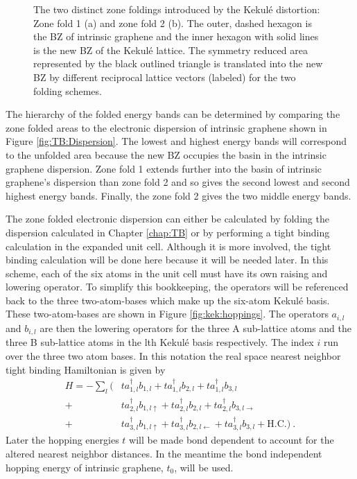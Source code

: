 \begin{figure}
	\begin{center}
	
	\end{center}
	\caption[The zone foldings introduced by the Kekul\'e distortion]{\label{fig:kek:folding}
		The two distinct zone foldings introduced by the Kekul\'e distortion: Zone fold 1 (a) and zone fold 2 (b).
		The outer, dashed hexagon is the BZ of intrinsic graphene and the inner hexagon with solid lines is the new BZ of the Kekul\'e lattice.
		The symmetry reduced area represented by the black outlined triangle is translated into the new BZ by different reciprocal lattice vectors (labeled) for the two folding schemes.
		}
\end{figure}

The hierarchy of the folded energy bands can be determined by comparing the zone folded areas to the electronic dispersion of intrinsic graphene shown in Figure \ref{fig:TB:Dispersion}.
The lowest and highest energy bands will correspond to the unfolded area because the new BZ occupies the basin in the intrinsic graphene dispersion.
Zone fold 1 extends further into the basin of intrinsic graphene's dispersion than zone fold 2 and so gives the second lowest and second highest energy bands.
Finally, the zone fold 2 gives the two middle energy bands.

The zone folded electronic dispersion can either be calculated by folding the dispersion calculated in Chapter \ref{chap:TB} or by performing a tight binding calculation in the expanded unit cell.
Although it is more involved, the tight binding calculation will be done here because it will be needed later.
In this scheme, each of the six atoms in the unit cell must have its own raising and lowering operator.
To simplify this bookkeeping, the operators will be referenced back to the three two-atom-bases which make up the six-atom Kekul\'e basis.
These two-atom-bases are shown in Figure \ref{fig:kek:hoppings}.
The operators $a_{i,l}$ and $b_{i,l}$ are then the lowering operators for the three A sub-lattice atoms and the three B sub-lattice atoms in the lth Kekul\'e basis respectively.
The index $i$ run over the three two atom bases.
In this notation the real space nearest neighbor tight binding Hamiltonian is given by
\newcommand{\rl}[4]{
	a^{\dagger}_{#1,#2} b_{#3,#4}
}
\begin{align}
	H=-\sum_l (
		 & t \rl{1}{l}{1}{l        }+t\rl{1}{l}{2}{l          }+t\rl{1}{l}{3}{l           } \nonumber \\
		+& t \rl{2}{l}{1}{l\uparrow}+t\rl{2}{l}{2}{l          }+t\rl{2}{l}{3}{l\rightarrow} \nonumber \\ 
		+& t \rl{3}{l}{1}{l\uparrow}+t\rl{3}{l}{2}{l\leftarrow}+t\rl{3}{l}{3}{l           } + \text{H.C.} ) \ .
		\label{eq:kek:Hreal}
\end{align}
Later the hopping energies $t$ will be made bond dependent to account for the altered nearest neighbor distances.
In the meantime the bond independent hopping energy of intrinsic graphene, $t_0$, will be used.


